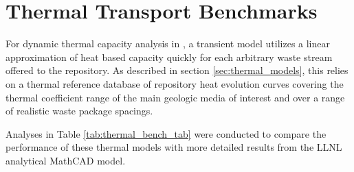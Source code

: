 \section{Thermal Transport Benchmarks} \label{sec:thermal_benchmarking}



For dynamic thermal capacity analysis in \Cyder, a transient model utilizes a 
linear approximation of heat based capacity quickly for each arbitrary waste 
stream offered to the repository. As described in section 
\ref{sec:thermal_models}, this relies on a thermal reference database 
of repository heat evolution curves covering the thermal coefficient range of 
the main geologic media of interest and over a range of realistic waste package 
spacings. 

Analyses in Table \ref{tab:thermal_bench_tab} were conducted to compare the 
performance of these thermal models with more detailed results from the 
\gls{LLNL} analytical MathCAD model.


